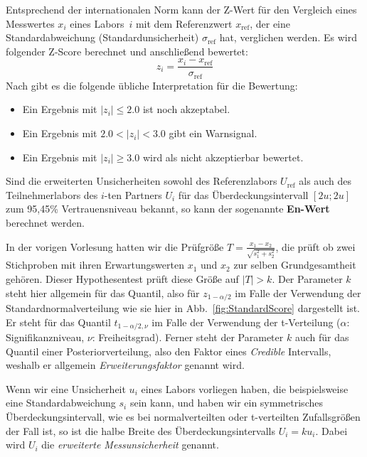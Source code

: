 Entsprechend der internationalen Norm \cite{ISO13528} kann der Z-Wert für den Vergleich eines
Messwertes $x_{i}$ eines Labors~$i$ mit dem Referenzwert $x_\mathrm{ref}$, der eine
Standardabweichung (Standardunsicherheit) $\sigma_\mathrm{ref}$ hat, verglichen werden.
Es wird folgender Z-Score berechnet und anschließend bewertet:
\begin{equation}
 z_i = \frac{x_{i}-x_\mathrm{ref}}{\sigma_\mathrm{ref}}
\end{equation}
Nach \cite{ISO13528} gibt es die folgende übliche Interpretation für die Bewertung:
\begin{itemize}
	\item Ein Ergebnis mit $|z_i| \le 2.0$ ist noch akzeptabel.
	\item Ein Ergebnis mit $ 2.0 < |z_i| < 3.0$ gibt ein Warnsignal.
	\item Ein Ergebnis mit $|z_i| \ge 3.0 $ wird als nicht akzeptierbar bewertet.
\end{itemize}
Sind die erweiterten Unsicherheiten sowohl des Referenzlabors $U_\mathrm{ref}$ als auch
des Teilnehmerlabors des $i$-ten Partners $U_{i}$ für das
Überdeckungsintervall $[2 u; 2 u]$ zum 95,45\% Vertrauensniveau bekannt,
so kann der sogenannte \textbf{En-Wert} berechnet werden.

In der vorigen Vorlesung hatten wir die Prüfgröße
$T = \frac{x_1 - x_2}{\sqrt{s_1^2 + s_2^2}}$, die prüft ob zwei Stichproben mit ihren Erwartungswerten
$x_1$ und $x_2$ zur selben Grundgesamtheit gehören.
Dieser Hypothesentest prüft diese Größe auf $|T| > k$. Der Parameter $k$ steht hier allgemein für das Quantil,
also für $z_{1-\alpha/2}$ im Falle der Verwendung der Standardnormalverteilung wie sie hier in Abb.~\ref{fig:StandardScore}
dargestellt ist. Er steht für das Quantil $t_{1-\alpha/2,\nu}$ im Falle der Verwendung der t-Verteilung ($\alpha$: Signifikanzniveau, $\nu$:
Freiheitsgrad). Ferner steht der Parameter $k$ auch für das Quantil einer Posteriorverteilung, also den Faktor
eines \textsl{Credible} Intervalls, weshalb er allgemein \textsl{Erweiterungsfaktor} genannt wird.

Wenn wir eine Unsicherheit $u_i$ eines Labors vorliegen haben, die beispielsweise eine Standardabweichung $s_i$ sein kann, und haben wir ein symmetrisches Überdeckungsintervall, wie es bei normalverteilten oder t-verteilten Zufallsgrößen der Fall ist, so ist die halbe Breite des Überdeckungsintervalls $U_i = k u_i$. Dabei wird $U_i$ die \textsl{erweiterte Messunsicherheit} genannt.

